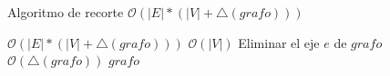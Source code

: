\begin{algorithm}[H]
	\caption{Algoritmo de recorte \Comment $\mathcal{O}(|E|*(|V| + \triangle(grafo)))$}
	\begin{algorithmic}[1]
		 \Comment $\mathcal{O}(|E|*(|V| + \triangle(grafo)))$
		 \Comment $\mathcal{O}(|V|)$
		\State Eliminar el eje $e$ de $grafo$ \Comment $\mathcal{O}(\triangle(grafo))$
		\EndIf
		\EndFor
		\Statex
		\State \Return $grafo$
		\EndFunction
	\end{algorithmic}
\end{algorithm}